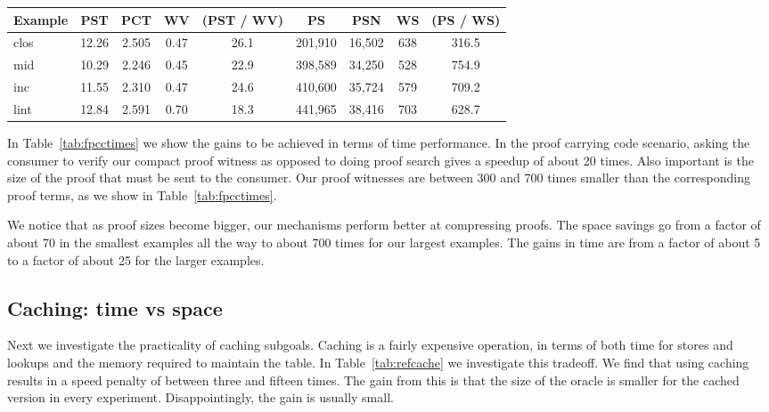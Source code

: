 \documentclass{llncs}
\begin{document}
\begin{table*}[htbp]
\begin{center}
\begin{small}
\begin{tabular}{|l|c|c|c|c|c|c|c|c|}
\hline
Example & PST & PCT & WV & (PST / WV) & PS & PSN & WS & (PS / WS)\\
\hline
clos & 12.26 & 2.505 & 0.47 & 26.1& 201,910 & 16,502 & 638 & 316.5\\
mid & 10.29 & 2.246 & 0.45 & 22.9& 398,589 & 34,250 & 528 & 754.9\\
inc & 11.55 & 2.310 & 0.47 & 24.6& 410,600 & 35,724 & 579 & 709.2\\
lint & 12.84 & 2.591 & 0.70 & 18.3& 441,965 & 38,416 & 703 & 628.7\\
\hline
\end{tabular}
\end{small}
\end{center}
\caption{\label{tab:fpcctimes}
FPCC: Times without Caching}
\end{table*}

In Table~\ref{tab:fpcctimes} we show the gains to be achieved in terms
of time performance. In the proof carrying code scenario, asking the
consumer to verify our compact proof witness as opposed to doing proof
search gives a speedup of about 20 times. Also important is the size
of the proof that must be sent to the consumer. Our proof witnesses
are between 300 and 700 times smaller than the corresponding proof
terms, as we show in Table~\ref{tab:fpcctimes}.

We notice that as proof sizes become bigger, our mechanisms perform
better at compressing proofs.  The space savings go from a factor of
about 70 in the smallest examples all the way to about 700 times for
our largest examples. The gains in time are from a factor of about 5
to a factor of about 25 for the larger examples.

\subsection{Caching: time vs space}
Next we investigate the practicality of caching subgoals. Caching is a
fairly expensive operation, in terms of both time for stores and
lookups and the memory required to maintain the table. In
Table~\ref{tab:refcache} we investigate this tradeoff. We find that
using caching results in a speed penalty of between three and fifteen
times. The gain from this is that the size of the oracle is smaller
for the cached version in every experiment. Disappointingly, the gain
is usually small.
\end{document}
